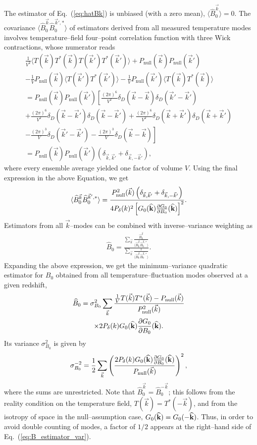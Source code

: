 \documentclass[aps,prd,twocolumn,floatfix,showpacs,superscriptaddress,nofootinbib]{revtex4-1}
\newcommand{\beq}{\begin{equation}}
\newcommand{\eeq}{\end{equation}}
\newcommand{\bga}{\begin{gathered}}
\newcommand{\ega}{\end{gathered}}
\newcommand{\eq}[1]{{Eq.~(#1)}}
\begin{document}
The estimator of \eq{\ref{eq:hatBk}} is unbiased (with a zero mean), $\langle \widehat B_0^{\vec k}\rangle=0$. The covariance $\langle \widehat B_0^{\vec k}\widehat B_0^{{\vec k'},*}\rangle $ of estimators derived from all measured temperature modes involves temperature--field four--point correlation function with three Wick contractions, whose numerator reads
\beq
\bga
\frac{1}{V^2}\langle T(\vec k)T^*(\vec k)T(\vec k')T^*(\vec k') \rangle + P_\text{null}(\vec k)P_\text{null}(\vec k')\\
- \frac{1}{V}P_\text{null}(\vec k)\langle T(\vec k')T^*(\vec k') \rangle
- \frac{1}{V}P_\text{null}(\vec k')\langle T(\vec k)T^*(\vec k) \rangle \\
= P_\text{null}(\vec k)P_\text{null}(\vec k') \left[\frac{(2\pi)^6}{V^2}\right.\delta_D(\vec k-\vec k)\delta_D(\vec k'-\vec k')\\
+\frac{(2\pi)^6}{V^2}\delta_D(\vec k-\vec k')\delta_D(\vec k-\vec k')+
\frac{(2\pi)^6}{V^2}\delta_D(\vec k+\vec k')\delta_D(\vec k+\vec k')\\
-\frac{(2\pi)^3}{V}\delta_D(\vec k'-\vec k')-\left.\frac{(2\pi)^3}{V}\delta_D(\vec k-\vec k)\right]\\
=P_\text{null}(\vec k)P_\text{null}(\vec k')\left(\delta_{\vec k,\vec k'} + \delta_{\vec k,-\vec k'}\right),
\ega
\label{eq:TTTT_expansion}
\eeq
where every ensemble average yielded one factor of volume $V$. Using the final expression in the above Equation, we get  
\beq
\langle \widehat B_0^{\vec k}\widehat B_0^{{\vec k'},*}\rangle = \frac{P_\text{null}^2(\vec k)\left(\delta_{\vec k,\vec k'}  + \delta_{\vec k,-\vec k'} \right)}{4P_{\delta}( k)^2\left[G_0({\bf{\widehat k}})\frac{\partial G_0}{\partial B_0}({\bf{\widehat k}})\right]^2}.
\label{eq:B_covariance}
\eeq
Estimators from all $\vec k$--modes can be combined with inverse--variance weighting as
\beq
\bga
\widehat B_0 = \frac{\sum_{\vec k}\frac{\widehat B_0^{\vec k}}{\langle \widehat B_0^{\vec k}\widehat B_0^{{\vec k},*}\rangle}}{\sum_{\vec k}\frac{1}{\langle \widehat B_0^{\vec k}\widehat B_0^{{\vec k},*}\rangle}}.
\ega
\label{eq:B_mve}
\eeq 
Expanding the above expression, we get the minimum--variance quadratic estimator for $B_0$ obtained from all temperature--fluctuation modes  observed at a given redshift, 
\beq
\bga
\widehat B_0 = \sigma^{2}_{ B_0}\sum_{\vec k}\frac{\frac{1}{V}T(\vec k)T^*(\vec k) - P_\text{null}(\vec k)}{P_\text{null}^2(\vec k)}\\
\times 2P_{\delta}( k)G_0({\bf{\widehat k}})\frac{\partial G_0}{\partial B_0}({\bf{\widehat k}}).
\ega
\label{eq:B_estimator}
\eeq
Its variance $\sigma^{2}_{ B_0}$ is given by
\beq
\bga
\sigma^{-2}_{ B_0} = \frac{1}{2}\sum_{\vec k}\left(\frac{2P_{\delta}(k)G_0({\bf{\widehat k}})\frac{\partial G_0}{\partial B_0}({\bf{\widehat k}})}{P_\text{null}(\vec k)}\right)^{2},
\ega
\label{eq:B_estimator_var}
\eeq
where the sums are unrestricted. Note that $\widehat B_0^{\vec k}=\widehat B_0^{-\vec k}$; this follows from the reality condition on the temperature field, $T(\vec k)=T^*(-\vec k)$, and from the isotropy of space in the null--assumption case, $G_0({\bf{\widehat k}})=G_0(-{\bf{\widehat k}})$. Thus, in order to avoid double counting of modes, a factor of $1/2$ appears at the right--hand side of Eq.~(\ref{eq:B_estimator_var}).
\end{document}
